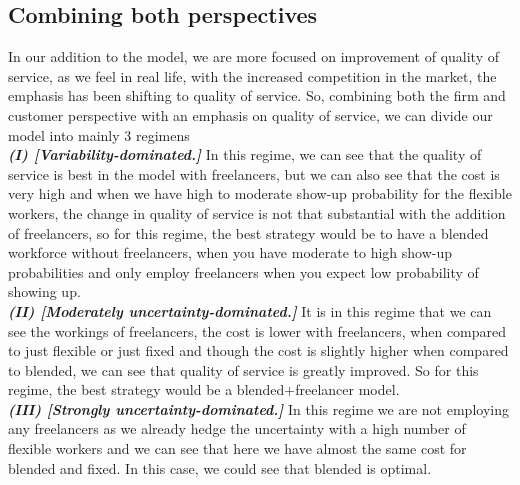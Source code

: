 \subsection{Combining both perspectives}
In our addition to the model, we are more focused on improvement of quality of service, as we feel in real life, with the increased competition in the market, the emphasis has been shifting to quality of service. So, combining both the firm and customer perspective with an emphasis on quality of service, we can divide our model into mainly 3 regimens
\\ \textbf{ \textit {(I) [Variability-dominated.]}} In this regime, we can see that the quality of service is best in the model with freelancers, but we can also see that the cost is very high and when we have high to moderate show-up probability for the flexible workers, the change in quality of service is not that substantial with the addition of freelancers, so for this regime, the best strategy would be to have a blended workforce without freelancers, when you have moderate to high show-up probabilities and only employ freelancers when you expect low probability of showing up.
\\ \textbf{ \textit {(II) [Moderately uncertainty-dominated.]}}
It is in this regime that we can see the workings of freelancers, the cost is lower with freelancers, when compared to just flexible or just fixed and though the cost is slightly higher when compared to blended, we can see that quality of service is greatly improved. So for this regime, the best strategy would be a blended+freelancer model.
\\ \textbf{ \textit {(III) [Strongly uncertainty-dominated.]}}
In this regime we are not employing any freelancers as we already hedge the uncertainty with a  high number of flexible workers and we can see that here we have almost the same cost for blended and fixed. In this case, we could see that blended is optimal.